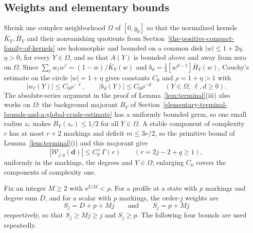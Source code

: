 \subsection{Weights and elementary bounds}\label{app:weights}
Shrink one complex neighborhood $\Omega$ of $[0,y_0]$ so that the
normalized kernels $\bar K_Y,\bar H_Y$ and their nonvanishing quotients
from Section~\ref{the-positive-compact-family-of-kernels} are holomorphic
and bounded on a common disk $|w|\le1+2\eta$, $\eta>0$, for every
$Y\in\Omega$, and so that $A(Y)$ is bounded above and away from zero on
$\Omega$. Since $\sum_\ell w_\ell w^\ell=(1-w)/\bar K_Y(w)$ and
$b_d=\frac13[w^{d-1}]\bar H_Y(w)$, Cauchy's estimate on the circle
$|w|=1+\eta$ gives constants $C_0$ and $\rho=1+\eta>1$ with
\begin{equation}
 |w_\ell(Y)|\le C_0\rho^{-\ell},\qquad |b_d(Y)|\le C_0\rho^{-d}
 \qquad(Y\in\Omega,\ \ell,d\ge0).
 \label{eq:FE-geom}
\end{equation}
The absolute-series argument in the proof of Lemma~\ref{lem:terminal}(iii) also works on $\Omega$:
the background majorant $B_Y$ of
Section~\ref{elementary-terminal-bounds-and-a-global-crude-estimate}
has a uniformly bounded germ, so one small radius $z_*$ makes
$B_Y(z_*)\le1/2$ for all $Y\in\Omega$. A stable component of complexity
$r$ has at most $r+2$ markings and deficit $m\le3r/2$, so the primitive
bound of Lemma~\ref{lem:terminal}(i) and this majorant give
\begin{equation}
 |\mathcal W_{j,q}(\mathbf d)|\le C_0^{\,r}\,\Gamma(r)\qquad(r=2j-2+q\ge1),
 \label{eq:FE-small}
\end{equation}
uniformly in the markings, the degrees and $Y\in\Omega$; enlarging
$C_0$ covers the components of complexity one.

Fix an integer $M\ge2$ with $\mathrm{e}^{2/M}<\rho$. For a profile at a
state with $p$ markings and degree sum $D$, and for a scalar with $p$
markings, the order-$j$ weights are
\begin{equation}
 S_j=D+p+Mj\qquad\text{and}\qquad S_j=p+Mj
 \label{eq:FE-weights}
\end{equation}
respectively, so that $S_j\ge Mj\ge j$ and $S_j\ge p$. The following four
bounds are used repeatedly.

